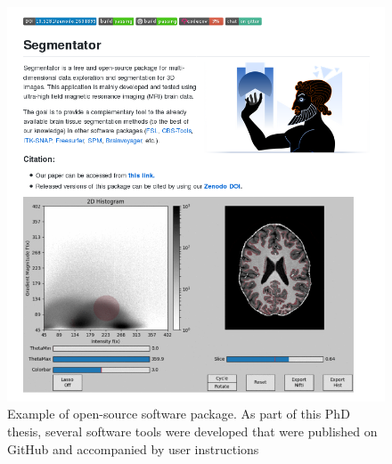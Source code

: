 \begin{figure}[!htbp]
\centering
\includegraphics[width=\textwidth]{figures/valorization/segmentator_readme.png}
\caption{Example of open-source software package. As part of this PhD thesis, several software tools were developed that were published on GitHub and accompanied by user instructions}
\label{fig:open_source_tool} 
\end{figure}
\stopsupplement


